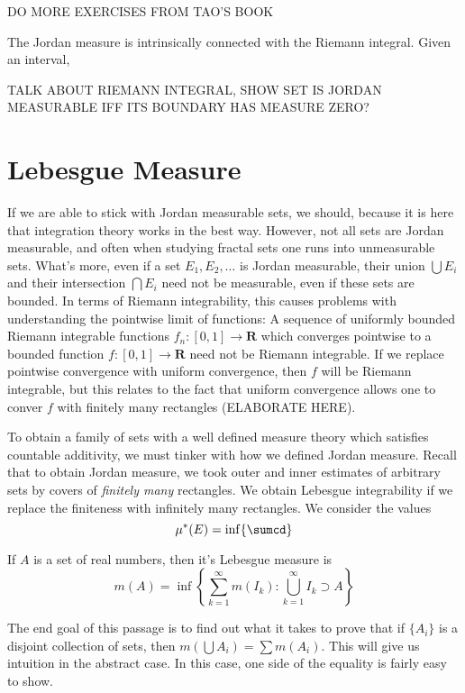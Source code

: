 DO MORE EXERCISES FROM TAO'S BOOK

The Jordan measure is intrinsically connected with the Riemann integral. Given an interval,

TALK ABOUT RIEMANN INTEGRAL, SHOW SET IS JORDAN MEASURABLE IFF ITS BOUNDARY HAS MEASURE ZERO?

\section{Lebesgue Measure}

If we are able to stick with Jordan measurable sets, we should, because it is here that integration theory works in the best way. However, not all sets are Jordan measurable, and often when studying fractal sets one runs into unmeasurable sets. What's more, even if a set $E_1, E_2, \dots$ is Jordan measurable, their union $\bigcup E_i$ and their intersection $\bigcap E_i$ need not be measurable, even if these sets are bounded. In terms of Riemann integrability, this causes problems with understanding the pointwise limit of functions: A sequence of uniformly bounded Riemann integrable functions $f_n: [0,1] \to \mathbf{R}$ which converges pointwise to a bounded function $f: [0,1] \to \mathbf{R}$ need not be Riemann integrable. If we replace pointwise convergence with uniform convergence, then $f$ will be Riemann integrable, but this relates to the fact that uniform convergence allows one to conver $f$ with finitely many rectangles (ELABORATE HERE).

To obtain a family of sets with a well defined measure theory which satisfies countable additivity, we must tinker with how we defined Jordan measure. Recall that to obtain Jordan measure, we took outer and inner estimates of arbitrary sets by covers of {\it finitely many} rectangles. We obtain Lebesgue integrability if we replace the finiteness with infinitely many rectangles. We consider the values
%
\[ \mu^*(E) = \inf \{ \sumcd \} \]

%
\begin{definition}
    If $A$ is a set of real numbers, then it's Lebesgue measure is
    \[ m(A) = \inf \left \{ \sum_{k = 1}^\infty m(I_k) : \bigcup_{k = 1}^\infty I_k \supset A \right \} \]
\end{definition}

The end goal of this passage is to find out what it takes to prove that if $\{A_i\}$ is a disjoint collection of sets, then $m(\bigcup A_i) = \sum m(A_i)$. This will give us intuition in the abstract case. In this case, one side of the equality is fairly easy to show.

